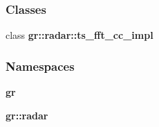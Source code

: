 \subsubsection*{Classes}
\begin{DoxyCompactItemize}
\item 
class {\bf gr\+::radar\+::ts\+\_\+fft\+\_\+cc\+\_\+impl}
\end{DoxyCompactItemize}
\subsubsection*{Namespaces}
\begin{DoxyCompactItemize}
\item 
 {\bf gr}
\item 
 {\bf gr\+::radar}
\end{DoxyCompactItemize}
